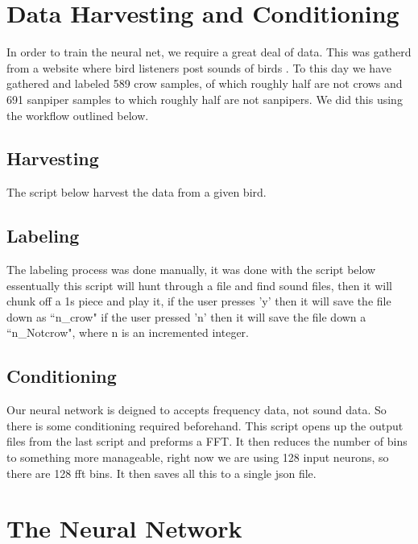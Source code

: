 \documentclass{article}
\begin{document}
\section{Data Harvesting and Conditioning}
In order to train the neural net, we require a great deal of data. This was gatherd from a website where bird listeners post sounds of birds \cite{Bird}. To this day we have gathered and labeled 589 crow samples, of which roughly half are not crows and 691 sanpiper samples to which roughly half are not sanpipers. We did this using the workflow outlined below.

\subsection{Harvesting}
The script below harvest the data from a given bird.


\subsection{Labeling}
The labeling process was done manually, it was done with the script below essentually this script will hunt through a file and find sound files, then it will chunk off a 1s piece and play it, if the user presses 'y' then it will save the file down as ``n\_crow" if the user pressed 'n' then it will save the file down a ``n\_Notcrow", where n is an incremented integer.


\subsection{Conditioning}
Our neural network is deigned to accepts frequency data, not sound data. So there is some conditioning required beforehand. This script opens up the output files from the last script and preforms a FFT. It then reduces the number of bins to something more manageable, right now we are using 128 input neurons, so there are 128 fft bins. It then saves all this to a single json file. 


\section{The Neural Network}
\end{document}
